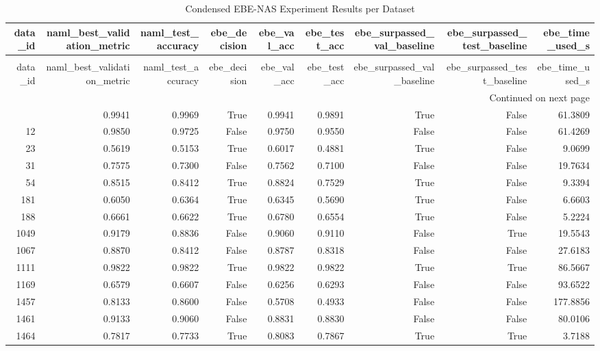 \begin{longtable}{rrrrrrrrr}
\caption{Condensed EBE-NAS Experiment Results per Dataset} \label{tab:master_results} \\
\toprule
data\_id & naml\_best\_validation\_metric & naml\_test\_accuracy & ebe\_decision & ebe\_val\_acc & ebe\_test\_acc & ebe\_surpassed\_val\_baseline & ebe\_surpassed\_test\_baseline & ebe\_time\_used\_s \\
\midrule
\endfirsthead
\caption[]{Condensed EBE-NAS Experiment Results per Dataset} \\
\toprule
data\_id & naml\_best\_validation\_metric & naml\_test\_accuracy & ebe\_decision & ebe\_val\_acc & ebe\_test\_acc & ebe\_surpassed\_val\_baseline & ebe\_surpassed\_test\_baseline & ebe\_time\_used\_s \\
\midrule
\endhead
\midrule
\multicolumn{9}{r}{Continued on next page} \\
\midrule
\endfoot
\bottomrule
\endlastfoot
3 & 0.9941 & 0.9969 & True & 0.9941 & 0.9891 & True & False & 61.3809 \\
12 & 0.9850 & 0.9725 & False & 0.9750 & 0.9550 & False & False & 61.4269 \\
23 & 0.5619 & 0.5153 & True & 0.6017 & 0.4881 & True & False & 9.0699 \\
31 & 0.7575 & 0.7300 & False & 0.7562 & 0.7100 & False & False & 19.7634 \\
54 & 0.8515 & 0.8412 & True & 0.8824 & 0.7529 & True & False & 9.3394 \\
181 & 0.6050 & 0.6364 & True & 0.6345 & 0.5690 & True & False & 6.6603 \\
188 & 0.6661 & 0.6622 & True & 0.6780 & 0.6554 & True & False & 5.2224 \\
1049 & 0.9179 & 0.8836 & False & 0.9060 & 0.9110 & False & True & 19.5543 \\
1067 & 0.8870 & 0.8412 & False & 0.8787 & 0.8318 & False & False & 27.6183 \\
1111 & 0.9822 & 0.9822 & True & 0.9822 & 0.9822 & True & True & 86.5667 \\
1169 & 0.6579 & 0.6607 & False & 0.6256 & 0.6293 & False & False & 93.6522 \\
1457 & 0.8133 & 0.8600 & False & 0.5708 & 0.4933 & False & False & 177.8856 \\
1461 & 0.9133 & 0.9060 & False & 0.8831 & 0.8830 & False & False & 80.0106 \\
1464 & 0.7817 & 0.7733 & True & 0.8083 & 0.7867 & True & True & 3.7188 \\

\end{longtable}
